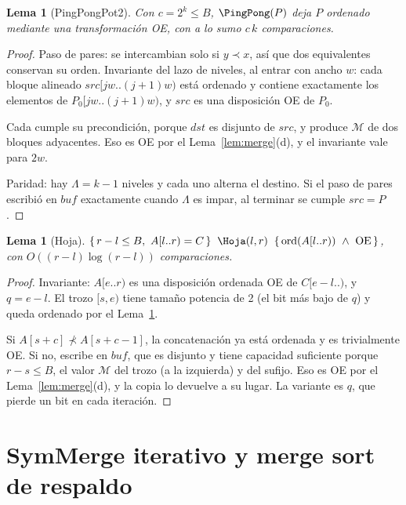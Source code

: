 \documentclass[10pt,a4paper]{article}
\theoremstyle{plain}
\newtheorem{lema}[teorema]{Lema}
\theoremstyle{definition}
\theoremstyle{remark}
\newcommand{\lt}{\prec}
\newcommand{\nlt}{\not\prec}
\newcommand{\buf}{\mathit{buf}}
\newcommand{\Bsz}{B}
\newcommand{\Mrg}{\mathcal{M}}
\newcommand{\hoare}[3]{\{\,#1\,\}\;\;#2\;\;\{\,#3\,\}}
\newcommand{\sortd}{\operatorname{ord}}
\begin{document}
\begin{lema}[PingPongPot2]\label{lem:pingpong}
Con $c=2^k\le\Bsz$, $\PingPong(P)$ deja $P$ ordenado mediante una transformación OE,
con a lo sumo $c\,k$ comparaciones.
\end{lema}
\begin{proof}
Paso de pares: se intercambian solo si $y\lt x$, así que dos equivalentes conservan
su orden. Invariante del lazo de niveles, al entrar con ancho $w$: cada bloque
alineado $\mathit{src}[jw..(j{+}1)w)$ está ordenado y contiene exactamente los
elementos de $P_0[jw..(j{+}1)w)$, y $\mathit{src}$ es una disposición OE de $P_0$.

Cada \Parity cumple su precondición, porque $\mathit{dst}$ es disjunto de
$\mathit{src}$, y produce $\Mrg$ de dos bloques adyacentes. Eso es OE por el
Lema~\ref{lem:merge}(d), y el invariante vale para $2w$.

Paridad: hay $\Lambda=k-1$ niveles y cada uno alterna el destino. Si el paso de pares
escribió en $\buf$ exactamente cuando $\Lambda$ es impar, al terminar se cumple
$\mathit{src}=P$.
\end{proof}

\begin{lema}[Hoja]\label{lem:hoja}
$\hoare{r-l\le\Bsz,\ A[l..r)=C}{\Hoja(l,r)}{\sortd(A[l..r))\ \wedge\ \text{OE}}$, con
$O((r-l)\log(r-l))$ comparaciones.
\end{lema}
\begin{proof}
Invariante: $A[e..r)$ es una disposición ordenada OE de $C[e{-}l..)$, y
$q=e-l$. El trozo $[s,e)$ tiene tamaño potencia de 2 (el bit más bajo de $q$) y queda
ordenado por el Lema~\ref{lem:pingpong}.

Si $A[s+c]\nlt A[s+c-1]$, la concatenación ya está ordenada y es trivialmente OE. Si
no, \Parity escribe en $\buf$, que es disjunto y tiene capacidad suficiente porque
$r-s\le\Bsz$, el valor $\Mrg$ del trozo (a la izquierda) y del sufijo. Eso es OE por
el Lema~\ref{lem:merge}(d), y la copia lo devuelve a su lugar. La variante es $q$,
que pierde un bit en cada iteración.
\end{proof}

\section{SymMerge iterativo y merge sort de respaldo}
\end{document}
